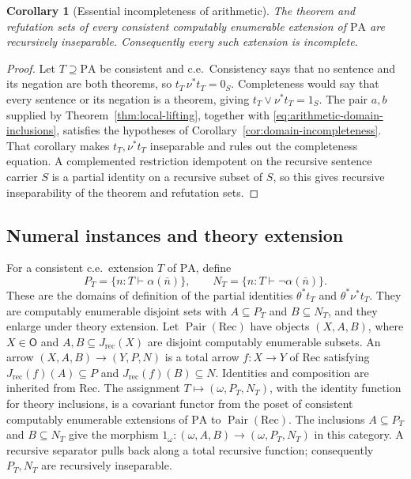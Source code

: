 \documentclass[11pt]{article}
\newtheorem{corollary}[theorem]{Corollary}
\newcommand{\PA}{\mathrm{PA}}
\begin{document}
\begin{corollary}[Essential incompleteness of arithmetic]\label{cor:arithmetic}
The theorem and refutation sets of every consistent computably
enumerable extension of $\PA$ are recursively inseparable.
Consequently every such extension is incomplete.
\end{corollary}
\begin{proof}
Let $T\supseteq\PA$ be consistent and c.e.\ Consistency says that
no sentence and its negation are both theorems, so
$t_T\,\nu^*t_T=0_S$. Completeness would say that every sentence or
its negation is a theorem, giving $t_T\vee\nu^*t_T=1_S$.
The pair $a,b$ supplied by Theorem~\ref{thm:local-lifting}, together
with \eqref{eq:arithmetic-domain-inclusions}, satisfies the hypotheses
of Corollary~\ref{cor:domain-incompleteness}. That corollary makes
$t_T,\nu^*t_T$ inseparable and rules out the completeness equation.
A complemented restriction idempotent on the recursive sentence carrier
$S$ is a partial identity on a recursive subset of $S$, so this gives
recursive inseparability of the theorem and refutation sets.
\end{proof}

\subsection{Numeral instances and theory extension}

For a consistent c.e.\ extension $T$ of $\PA$, define
\[
 P_T=\{n:T\vdash\alpha(\bar n)\},\qquad
 N_T=\{n:T\vdash\neg\alpha(\bar n)\}.
\]
These are the domains of definition of the partial identities
$\theta^*t_T$ and $\theta^*\nu^*t_T$.
They are computably enumerable disjoint sets with $A\subseteq P_T$
and $B\subseteq N_T$, and they enlarge under theory extension.
Let $\operatorname{Pair}(\mathrm{Rec})$ have objects $(X,A,B)$,
where $X\in\mathsf O$ and $A,B\subseteq J_{\mathrm{rec}}(X)$
are disjoint computably enumerable subsets.
An arrow $(X,A,B)\to(Y,P,N)$ is a total arrow $f:X\to Y$
of $\mathrm{Rec}$ satisfying $J_{\mathrm{rec}}(f)(A)\subseteq P$ and
$J_{\mathrm{rec}}(f)(B)\subseteq N$. Identities and composition are inherited
from $\mathrm{Rec}$. The assignment
$T\mapsto(\omega,P_T,N_T)$, with the identity function for theory
inclusions, is a covariant functor from the poset of consistent
computably enumerable extensions of $\PA$ to
$\operatorname{Pair}(\mathrm{Rec})$.
The inclusions $A\subseteq P_T$ and $B\subseteq N_T$ give the morphism
$1_\omega:(\omega,A,B)\to(\omega,P_T,N_T)$ in this category.
A recursive separator pulls back along a total recursive function;
consequently $P_T,N_T$ are recursively inseparable.
\end{document}
